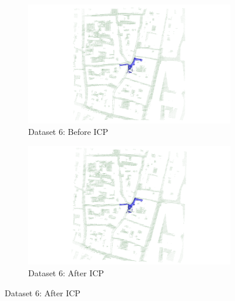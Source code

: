 \documentclass[11pt]{article}
\begin{document}
\begin{figure}[p]
        \vspace{1em}

        \begin{subfigure}{0.45\textwidth}
            \centering
            \includegraphics[width=\linewidth]{images/full/ply/5_7_1_before_icp}
            \caption{Dataset 6: Before ICP}
        \end{subfigure}
        \hfill
        \begin{subfigure}{0.45\textwidth}
            \centering
            \includegraphics[width=\linewidth]{images/full/ply/5_7_1_after_icp}
            \caption{Dataset 6: After ICP}
        \end{subfigure}

        \vspace{1em}


\end{figure}
\end{document}
